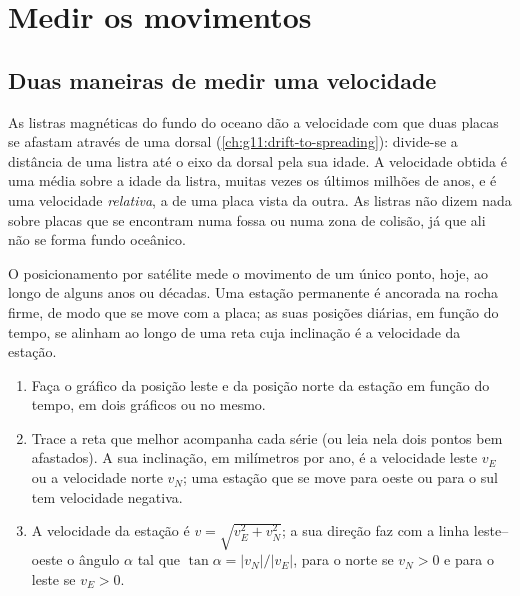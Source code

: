 \section{Medir os movimentos}

\subsection{Duas maneiras de medir uma velocidade}

As listras magnéticas do fundo do oceano dão a velocidade com que duas
placas se afastam através de uma dorsal (\cref{ch:g11:drift-to-spreading}):
divide-se a distância de uma listra até o eixo da dorsal pela sua idade. A
velocidade obtida é uma média sobre a idade da listra, muitas vezes os
últimos milhões de anos, e é uma velocidade \emph{relativa}, a de uma placa
vista da outra. As listras não dizem nada sobre placas que se encontram numa
fossa ou numa zona de colisão, já que ali não se forma fundo oceânico.

O posicionamento por satélite mede o movimento de um único ponto, hoje, ao
longo de alguns anos ou décadas. Uma estação permanente é ancorada na rocha
firme, de modo que se move com a placa; as suas posições diárias, em função
do tempo, se alinham ao longo de uma reta cuja inclinação é a velocidade da
estação.

\begin{method}\label{met:g11:plate-motions:rate}
\begin{enumerate}
  \item Faça o gráfico da posição leste e da posição norte da estação em
        função do tempo, em dois gráficos ou no mesmo.
  \item Trace a reta que melhor acompanha cada série (ou leia nela dois
        pontos bem afastados). A sua inclinação, em milímetros por ano, é a
        velocidade leste $v_E$ ou a velocidade norte $v_N$; uma estação que
        se move para oeste ou para o sul tem velocidade negativa.
  \item A velocidade da estação é $v = \sqrt{v_E^2 + v_N^2}$; a sua direção
        faz com a linha leste--oeste o ângulo $\alpha$ tal que
        $\tan\alpha = |v_N|/|v_E|$, para o norte se $v_N > 0$ e para
        o leste se $v_E > 0$.
\end{enumerate}
\end{method}

